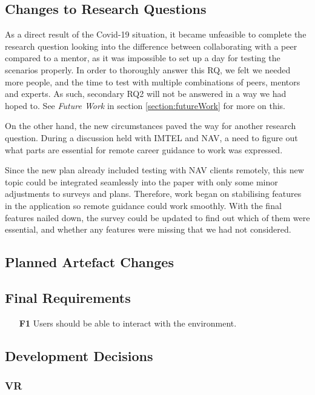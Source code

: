 \subsection{Changes to Research Questions}
As a direct result of the Covid-19 situation, it became unfeasible to complete the research question looking into the difference between collaborating with a peer compared to a mentor, as it was impossible to set up a day for testing the scenarios properly. In order to thoroughly answer this RQ, we felt we needed more people, and the time to test with multiple combinations of peers, mentors and experts. As such, secondary RQ2 will not be answered in a way we had hoped to. See \textit{Future Work} in section \ref{section:futureWork} for more on this.

On the other hand, the new circumstances paved the way for another research question. During a discussion held with IMTEL and NAV, a need to figure out what parts are essential for remote career guidance to work was expressed. 

Since the new plan already included testing with NAV clients remotely, this new topic could be integrated seamlessly into the paper with only some minor adjustments to surveys and plans. Therefore, work began on stabilising features in the application so remote guidance could work smoothly. With the final features nailed down, the survey could be updated to find out which of them were essential, and whether any features were missing that we had not considered.

\subsection{Planned Artefact Changes}


\subsection{Final Requirements}
\begin{enumerate}
  \item [\textbf{F1}] Users should be able to interact with the environment.
\end{enumerate}




\subsection{Development Decisions}
\subsubsection{VR}

